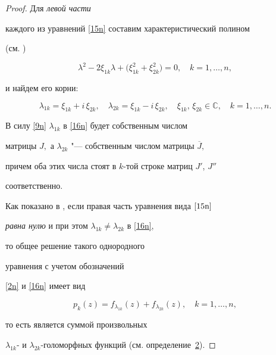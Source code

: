 \begin{proof}
Для {\it левой части}

 каждого из уравнений \eqref{15n} составим характеристический полином

(см. \cite{16Nk-Nk1})

$$

\lambda^2-2\xi_{1k}\lambda+\bigr(\xi_{1k}^2+\xi_{2k}^2\bigr)=0,

\quad k=1,\ldots,n,

$$

и найдем его корни:

\begin{equation}

\lambda_{1k}=\xi_{1k}+i\,\xi_{2k},\quad \lambda_{2k}=\xi_{1k}-i\,\xi_{2k},\quad

\xi_{1k},\,\xi_{2k}\in\mathbb{C},\quad k=1,\ldots,n.

\label{16n}

\end{equation}





В силу \eqref{9n}  $\lambda_{1k}$  в \eqref{16n} будет собственным числом

матрицы $J,$ а $\lambda_{2k}$ "--- собственным  числом матрицы $\overline{J},$

причем оба этих числа   стоят в $k$-той строке матриц $J'$, $J''$

соответственно.



Как показано в \cite{16Nk-Nk1}, если правая часть  уравнения вида $\eqref{15n}$

{\it равна нулю}  и при этом $\lambda_{1k}\ne\lambda_{2k}$ в \eqref{16n},

 то   общее решение такого  однородного

  уравнения   с учетом обозначений

 \eqref{2n} и \eqref{16n}   имеет вид

 \begin{equation}

p_k(z)=f_{\lambda_{\scriptstyle 1k}}(z)+f_{\lambda_{\scriptstyle 2k}}(z),

\quad k=1,\ldots,n,

\label{17n}

\end{equation}

то есть  является суммой произвольных

$\lambda_{1k}$- и $\lambda_{2k}$-голоморфных функций (см. определение~\hyperlink{nik:def2}{2}).




\end{proof}
